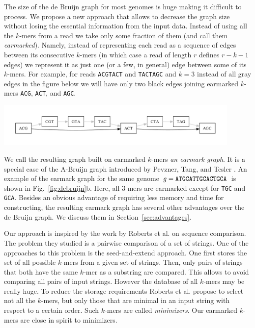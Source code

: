 \documentclass[12pt]{article}
\begin{document}
The size of the de Bruijn graph for most genomes is huge making
it difficult to process. 
We propose a new approach that allows to decrease
the graph size without losing the essential information from the input data.
Instead of using all the $k$-mers from a read we take only some fraction of them
(and call them \emph{earmarked}).
Namely, instead 
of representing each read as a sequence of edges 
between its consecutive $k$-mers (in which case a read of length $r$ defines
$r-k-1$ edges) we represent it as just one (or a few, in general)
edge between some of its $k$-mers. For example, for 
reads {\tt ACGTACT} and {\tt TACTAGC} and $k=3$
instead of all gray edges in the figure below we will have 
only two black edges joining earmarked $k$-mers {\tt ACG}, {\tt ACT}, and {\tt AGC}.
\begin{center}
\includegraphics[width=0.9\textwidth]{fig1.pdf}
\end{center}
We call the resulting graph built on earmarked $k$-mers \emph{an earmark graph}.
It is a special case of the A-Bruijn graph introduced by Pevzner, Tang, and Tesler \cite{PTG04}.
An example of the earmark graph for the same genome $g={\tt ATGCATTGCACTGCA}$ is shown in Fig.~\ref{fig:debruijn}b.
Here, all $3$-mers are earmarked except for {\tt TGC} and {\tt GCA}.
Besides an obvious advantage of requiring less memory 
and time for constructing, the resulting earmark graph has several other advantages over the
de Bruijn graph. We discuss them 
in Section~\ref{sec:advantages}.

Our approach is inspired by the work by Roberts et al. \cite{RW04} on sequence comparison.
The problem they studied is a pairwise comparison of a set of strings. 
One of the approaches to this problem is the seed-and-extend approach.
One first stores the set of all possible $k$-mers from a given set of strings.
Then, only pairs of strings that both have the same $k$-mer as a substring are compared.
This allows to avoid comparing all pairs of input strings. However the database
of all $k$-mers may be really huge. To reduce the storage requirements Roberts et al. propose
to select not all the $k$-mers, but only those that are minimal in an input string with respect
to a certain order. Such $k$-mers are called \emph{minimizers}. Our earmarked $k$-mers are close in spirit 
to minimizers.
\end{document}
